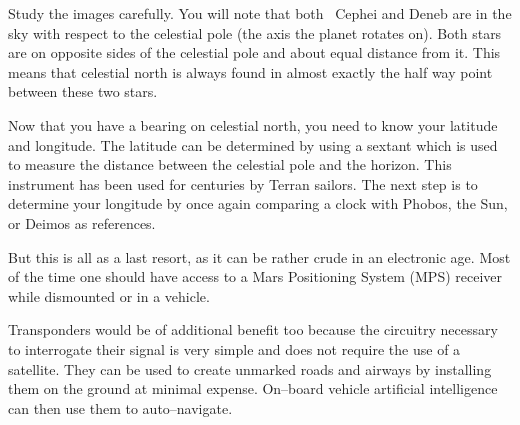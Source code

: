     {}
    {}
    {}
    \stopcombination

Study the images carefully. You will note that both \alpha\ Cephei and Deneb are  in the sky with respect to the celestial pole (the axis the planet rotates on). Both stars are on opposite sides of the celestial pole and about equal distance from it. This means that celestial north is always found in almost exactly the half way point between these two stars.

Now that you have a bearing on celestial north, you need to know your latitude and longitude. The latitude can be determined by using a sextant which is used to measure the distance between the celestial pole and the horizon. This instrument has been used for centuries by Terran sailors. The next step is to determine your longitude by once again comparing a clock with Phobos, the Sun, or Deimos as references.

But this is all as a last resort, as it can be rather crude in an electronic age. Most of the time one should have access to a Mars Positioning System (MPS) receiver while dismounted or in a vehicle. 

Transponders would be of additional benefit too because the circuitry necessary to interrogate their signal is very simple and does not require the use of a satellite. They can be used to create unmarked roads and airways by installing them on the ground at minimal expense. On--board vehicle artificial intelligence can then use them to auto--navigate.

